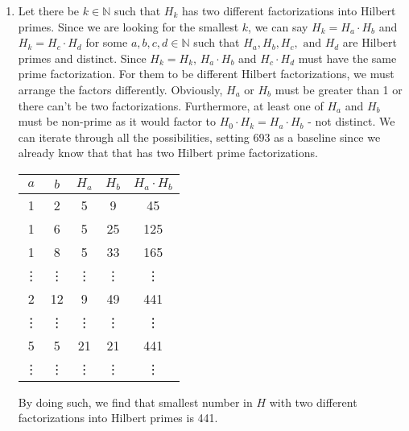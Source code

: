 \documentclass{article}
\begin{document}
\begin{solution}{}{}
\begin{enumerate}[label=\textbf{\alph*}.]
        \item Let there be $k\in\mathbb{N}$ such that $H_k$ has two different factorizations into Hilbert primes. Since we are looking for the smallest $k$, we can say $H_k=H_a\cdot H_b$ and $H_k=H_c\cdot H_d$ for some $a,b,c,d\in\mathbb{N}$ such that $H_a,H_b,H_c,\text{ and }H_d$ are Hilbert primes and distinct. Since $H_k=H_k$, $H_a\cdot H_b$ and $H_c\cdot H_d$ must have the same prime factorization. For them to be different Hilbert factorizations, we must arrange the factors differently. Obviously, $H_a$ or $H_b$ must be greater than 1 or there can't be two factorizations. Furthermore, at least one of $H_a$ and $H_b$ must be non-prime as it would factor to $H_0\cdot H_k=H_a\cdot H_b$ - not distinct. We can iterate through all the possibilities, setting 693 as a baseline since we already know that that has two Hilbert prime factorizations.
        \begin{center}
        \begin{tabular}{|c|c|c|c|c|}
        \hline
        $a$ & $b$ & $H_a$ & $H_b$ & $H_a \cdot H_b$ \\
        \hline
        1 & 2 & 5 & 9 & 45 \\
        1 & 6 & 5 & 25 & 125 \\
        1 & 8 & 5 & 33 & 165 \\
        \vdots & \vdots & \vdots & \vdots & \vdots \\
        2 & 12 & 9 & 49 & 441 \\
        \vdots & \vdots & \vdots & \vdots & \vdots \\
        5 & 5 & 21 & 21 & 441 \\
        \vdots & \vdots & \vdots & \vdots & \vdots \\
        \hline
        \end{tabular}
        \end{center}
        By doing such, we find that smallest number in $H$ with two different factorizations into Hilbert primes is 441.
    \end{enumerate}
\end{solution}
\end{document}
